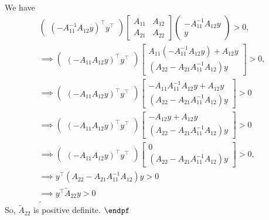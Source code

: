 \documentclass{report}
\begin{document}
\begin{remark}
    \bigbreak \noindent 
    We have
    \begin{align*}
        \begin{pmatrix} (-A_{11}^{-1}A_{12}y)^{\top} y^{\top} \end{pmatrix} \begin{bmatrix} A_{11} & A_{12} \\ A_{21} & A_{22} \end{bmatrix} \begin{pmatrix} -A_{11}^{-1}A_{12}y \\ y \end{pmatrix} > 0 , \\
        \implies \begin{pmatrix} (-A_{11}A_{12}y)^{\top} y^{\top} \end{pmatrix} \begin{bmatrix} A_{11}(-A_{11}^{-1}A_{12}y) + A_{12}y \\ (A_{22}-A_{21}A_{11}^{-1}A_{12})y \end{bmatrix} >0, \\
        \implies \begin{pmatrix} (-A_{11}A_{12}y)^{\top} y^{\top} \end{pmatrix} \begin{bmatrix} -A_{11}A_{11}^{-1}A_{12}y + A_{12}y \\ (A_{22}-A_{21}A_{11}^{-1}A_{12})y \end{bmatrix} >0 \\
        \implies \begin{pmatrix} (-A_{11}A_{12}y)^{\top} y^{\top} \end{pmatrix} \begin{bmatrix} -A_{12}y + A_{12}y \\ (A_{22}-A_{21}A_{11}^{-1}A_{12})y \end{bmatrix} >0 \\
        \implies \begin{pmatrix} (-A_{11}A_{12}y)^{\top} y^{\top} \end{pmatrix} \begin{bmatrix} 0 \\ (A_{22}-A_{21}A_{11}^{-1}A_{12})y \end{bmatrix} >0, \\
        \implies y^{\top}(A_{22}-A_{21}A_{11}^{-1}A_{12})y >0 \\
        \implies y^{\top}\tilde{A}_{22}y > 0 \\
    .\end{align*}
    So, $\tilde{A}_{22}$ is positive definite. $\endpf $


\end{remark}
\end{document}
